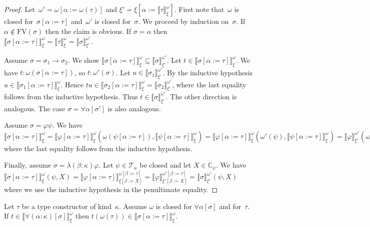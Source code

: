 \documentclass[runningheads,a4paper]{llncs}
\newcommand{\arrtype}{\rightarrow}
\newcommand{\subst}[2]{#1:=#2}
\newcommand{\FV}{\mathrm{FV}}
\newcommand{\Tc}{\mathcal{T}}
\newcommand{\Cb}{\mathbb{C}}
\newcommand{\val}[3]{\ensuremath{\llbracket#1\rrbracket_{#2}^{#3}}}
\begin{document}
\begin{proof}
  Let~$\omega' = \omega[\subst{\alpha}{\omega(\tau)}]$ and $\xi' =
  \xi[\subst{\alpha}{\val{\tau}{\xi}{\omega}}]$. First note
  that~$\omega$ is closed for~$\sigma[\subst{\alpha}{\tau}]$
  and~$\omega'$ is closed for~$\sigma$. We proceed by induction
  on~$\sigma$. If $\alpha \notin \FV(\sigma)$ then the claim is
  obvious. If $\sigma = \alpha$ then
  $\val{\sigma[\subst{\alpha}{\tau}]}{\xi}{\omega} =
  \val{\tau}{\xi}{\omega} = \val{\sigma}{\xi'}{\omega'}$.

  Assume $\sigma = \sigma_1\arrtype\sigma_2$. We show
  $\val{\sigma[\subst{\alpha}{\tau}]}{\xi}{\omega} \subseteq
  \val{\sigma}{\xi'}{\omega'}$. Let $t \in
  \val{\sigma[\subst{\alpha}{\tau}]}{\xi}{\omega}$. We have $t :
  \omega(\sigma[\subst{\alpha}{\tau}])$, so $t : \omega'(\sigma)$. Let
  $u \in \val{\sigma_1}{\xi'}{\omega'}$. By the inductive hypothesis
  $u \in \val{\sigma_1[\subst{\alpha}{\tau}]}{\xi}{\omega}$. Hence $t
  u \in \val{\sigma_2[\subst{\alpha}{\tau}]}{\xi}{\omega} =
  \val{\sigma_2}{\xi'}{\omega'}$, where the last equality follows from
  the inductive hypothesis. Thus $t \in
  \val{\sigma}{\xi'}{\omega'}$. The other direction is analogous. The
  case $\sigma = \forall\alpha[\sigma']$ is also analogous.

  Assume $\sigma = \varphi\psi$. We have
  $\val{\sigma[\subst{\alpha}{\tau}]}{\xi}{\omega} =
  \val{\varphi[\subst{\alpha}{\tau}]}{\xi}{\omega}(\omega(\psi[\subst{\alpha}{\tau}]),
  \val{\psi[\subst{\alpha}{\tau}]}{\xi}{\omega}) =
  \val{\varphi[\subst{\alpha}{\tau}]}{\xi}{\omega}(\omega'(\psi),
  \val{\psi[\subst{\alpha}{\tau}]}{\xi}{\omega}) =
  \val{\varphi}{\xi'}{\omega'}(\omega'(\psi),
  \val{\psi}{\xi'}{\omega'})$ where the last equality follows from the
  inductive hypothesis.

  Finally, assume $\sigma = \lambda(\beta:\kappa)\varphi$. Let $\psi
  \in \Tc_\kappa$ be closed and let $X \in \Cb_\psi$. We have
  $\val{\sigma[\subst{\alpha}{\tau}]}{\xi}{\omega}(\psi,X) =
  \val{\varphi[\subst{\alpha}{\tau}]}{\xi[\subst{\beta}{X}]}{\omega[\subst{\beta}{\tau}]}
  =
  \val{\varphi}{\xi'[\subst{\beta}{X}]}{\omega'[\subst{\beta}{\tau}]}
  = \val{\sigma}{\xi'}{\omega'}(\psi,X)$ where we use the inductive
  hypothesis in the penultimate equality.
\end{proof}

\begin{lemma}\label{lem_forall}
  Let $\tau$ be a type constructor of kind~$\kappa$. Assume $\omega$
  is closed for $\forall\alpha[\sigma]$ and for~$\tau$. If $t \in
  \val{\forall(\alpha:\kappa)[\sigma]}{\xi}{\omega}$ then $t
  (\omega(\tau)) \in \val{\sigma[\subst{\alpha}{\tau}]}{\xi}{\omega}$.
\end{lemma}
\end{document}
